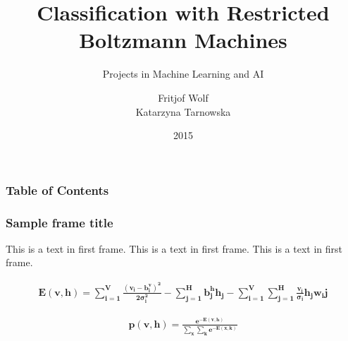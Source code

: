 \documentclass{beamer}
\title{Classification with Restricted Boltzmann Machines}
\subtitle{Projects in Machine Learning and AI}
\author{Fritjof Wolf \\ Katarzyna Tarnowska}
\date{2015}
\begin{document}
\frame{\titlepage}


\begin{frame}
\frametitle{Table of Contents}
\tableofcontents
\end{frame}
 
\begin{frame}
\frametitle{Sample frame title}
This is a text in first frame. This is a text in first frame. This is a text in first frame.
\end{frame}


\begin{align}
    \mathbf{E(v,h) = \sum_{i=1}^{V} \frac{(v_i - b_i^v)^2}{2\sigma_i^2} - \sum_{j=1}^{H} b_j^h h_j - \sum_{i=1}^{V} \sum_{j=1}^{H} \frac{v_i}{\sigma_i} h_j w_ij}
\end{align}

\begin{align}
    \mathbf{p(v,h) = \frac{e^{-E(v,h)}}{\sum_x \sum_k e^{-E(x,k)}}}
\end{align}
 
\end{document}

